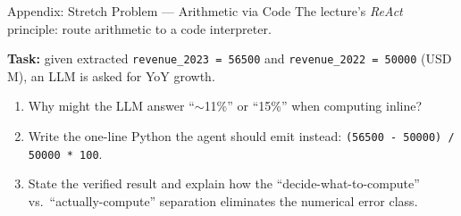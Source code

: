 \documentclass[9pt,t]{beamer}
\begin{document}
\begin{frame}[noframenumbering]{Appendix: Stretch Problem --- Arithmetic via Code}
The lecture's \emph{ReAct} principle: route arithmetic to a code interpreter.

\medskip
\textbf{Task:} given extracted \texttt{revenue\_2023 = 56500} and
\texttt{revenue\_2022 = 50000} (USD M), an LLM is asked for YoY growth.
\begin{enumerate}
  \item Why might the LLM answer ``$\sim$11\%'' or ``15\%'' when computing inline?
  \item Write the one-line Python the agent should emit instead:
        \texttt{(56500 - 50000) / 50000 * 100}.
  \item State the verified result and explain how the
        ``decide-what-to-compute'' vs.\ ``actually-compute'' separation eliminates
        the numerical error class.
\end{enumerate}
\end{frame}
\end{document}
